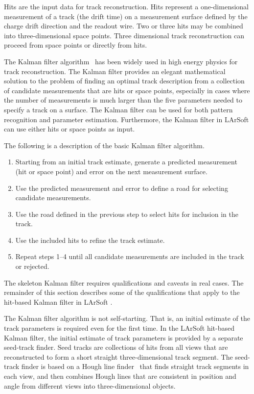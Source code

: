 \documentclass[12pt]{elsarticle}
\newcommand{\larsoft}{LArSoft }
\begin{document}
Hits are the input data for track reconstruction.  Hits
represent a one-dimensional measurement of a track (the
drift time) on a measurement surface defined by the charge drift
direction and the readout wire. Two or three hits may be combined
into three-dimensional space points. Three dimensional track
reconstruction can proceed from space points or directly from hits.

The Kalman filter algorithm~\cite{kalman} has been widely used in high
energy physics for track reconstruction. The Kalman
filter provides an elegant mathematical solution to the problem of
finding an optimal track description from a collection of candidate
measurements that are hits or space points, especially in cases where the
number of measurements is much larger than the five parameters
needed to specify a track on a surface.  The Kalman
filter can be used for both pattern recognition and parameter
estimation.  Furthermore, the Kalman filter in \larsoft can use either hits or
space points as input.

The following is a description of the basic Kalman filter algorithm.

\begin{enumerate}
\item
Starting from an initial track estimate, generate a predicted
measurement (hit or space point) and error on the next measurement
surface.
\item
Use the predicted measurement and error to define a road for selecting
candidate measurements.
\item
Use the road defined in the previous step to select hits for inclusion
in the track.
\item
Use the included hits to refine the track estimate.
\item
Repeat steps 1--4 until all candidate measurements are included in the
track or rejected.
\end{enumerate}

The skeleton Kalman filter requires qualifications and caveats in real cases. The remainder of this
section describes some of the qualifications that apply to the
hit-based Kalman filter in \larsoft.

The Kalman
filter algorithm is not self-starting. That is, an initial estimate
of the track parameters is required even for the first time.  In the \larsoft hit-based Kalman filter, the initial
estimate of track parameters is provided
by a separate seed-track finder. Seed tracks are
collections of hits from all views that are reconstructed to form a
short straight three-dimensional track segment. The seed-track finder
is based on a Hough line finder~\cite{ppht} that finds straight track
segments in each view, and then combines 
Hough lines that are consistent in position and angle from different views into three-dimensional
objects.
\end{document}
